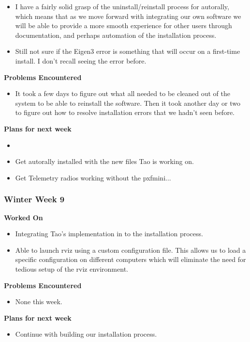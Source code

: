 \documentclass[compsoc,draftclsnofoot,onecolumn,10pt]{IEEEtran}
\begin{document}
\begin{itemize}
\item I have a fairly solid grasp of the uninstall/reinstall process for autorally, which means that as we move forward with integrating our own software we will be able to provide a more smooth experience for other users through documentation, and perhaps automation of the installation process.

\item Still not sure if the Eigen3 error is something that will occur on a first-time install. I don't recall seeing the error before.

\end{itemize}

\textbf{Problems Encountered}
\begin{itemize}
    \item It took a few days to figure out what all needed to be cleaned out of the system to be able to reinstall the software. Then it took another day or two to figure out how to resolve installation errors that we hadn't seen before.
\end{itemize}

\textbf{Plans for next week}
\begin{itemize}
    \item         \item Get autorally installed with the new files Tao is working on.
    \item Get Telemetry radios working without the pxfmini...
\end{itemize}

\subsubsection*{Winter Week 9}
\textbf{Worked On}
\begin{itemize}
    \item Integrating Tao's implementation in to the installation process.
    \item Able to launch rviz using a custom configuration file. This allows us to load a specific configuration on different computers which will eliminate the need for tedious setup of the rviz environment.
\end{itemize}

\textbf{Problems Encountered}
\begin{itemize}
    \item None this week.
\end{itemize}

\textbf{Plans for next week}
\begin{itemize}
    \item Continue with building our installation process.
\end{itemize}
\end{document}
